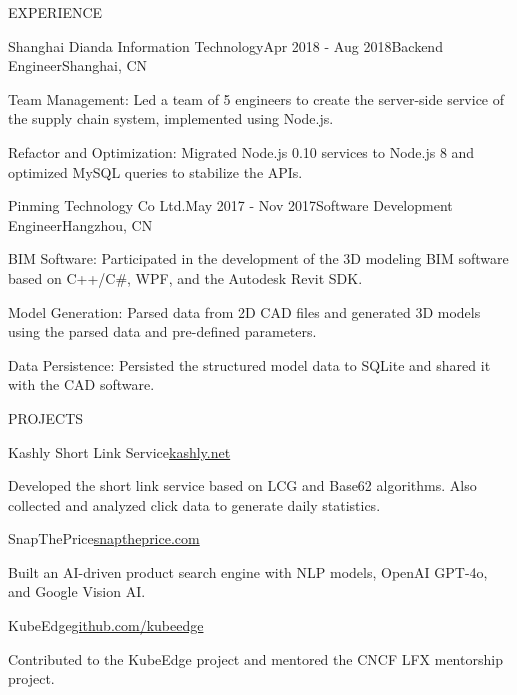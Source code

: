\documentclass{resume} %
\begin{document}
\begin{rSection}{EXPERIENCE}
  \begin{rSubsection}{Shanghai Dianda Information Technology}{Apr 2018 - Aug 2018}{Backend Engineer}{Shanghai, CN}
    \item Team Management: Led a team of 5 engineers to create the server-side service of the supply chain system, implemented using Node.js.
    \item Refactor and Optimization: Migrated Node.js 0.10 services to Node.js 8 and optimized MySQL queries to stabilize the APIs.
  \end{rSubsection}

  \begin{rSubsection}{Pinming Technology Co Ltd.}{May 2017 - Nov 2017}{Software Development Engineer}{Hangzhou, CN}
    \item BIM Software: Participated in the development of the 3D modeling BIM software based on C++/C\#, WPF, and the Autodesk Revit SDK.
    \item Model Generation: Parsed data from 2D CAD files and generated 3D models using the parsed data and pre-defined parameters.
    \item Data Persistence: Persisted the structured model data to SQLite and shared it with the CAD software.
  \end{rSubsection}

\end{rSection}


\begin{rSection}{PROJECTS}

\begin{rSubsection}{Kashly Short Link Service}{\href{https://kashly.net}{kashly.net}}{}{}
  \item Developed the short link service based on LCG and Base62 algorithms. Also collected and analyzed click data to generate daily statistics.
\end{rSubsection}

\begin{rSubsection}{SnapThePrice}{\href{https://snaptheprice.com}{snaptheprice.com}}{}{}
  \item Built an AI-driven product search engine with NLP models, OpenAI GPT-4o, and Google Vision AI.
\end{rSubsection}

\begin{rSubsection}{KubeEdge}{\href{https://github.com/kubeedge}{github.com/kubeedge}}{}{}
  \item Contributed to the KubeEdge project and mentored the CNCF LFX mentorship project.
\end{rSubsection}

\end{rSection}
\end{document}
